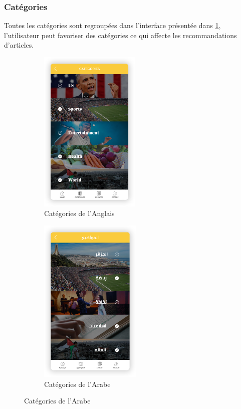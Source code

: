    \subsubsection{Catégories}
Toutes les catégories sont regroupées dans l'interface présentée dans \ref{categ-display}, l'utilisateur peut favoriser des catégories ce qui affecte les recommandations d'articles. 
\begin{figure}[H]
    \begin{minipage}{0.48\textwidth}
        \begin{figure}[H]
            \centering
            \includegraphics[width=136pt]{img/chapter4/feedny/en-categ.png}
            \caption{Catégories de l'Anglais}
        \end{figure}
    \end{minipage}\hfill
    \begin {minipage}{0.48\textwidth}
    \begin{figure}[H]
        \centering
        \includegraphics[width=138pt]{img/chapter4/feedny/ar-categ.png}
        \caption{Catégories de l'Arabe}
    \end{figure}
\end{minipage}
\label{categ-display}
\end{figure}

